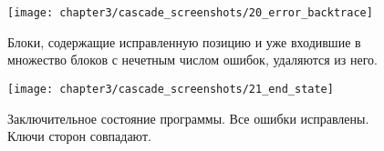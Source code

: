 \begin{figure}[h]
  \texttt{[image: chapter3/cascade\_screenshots/20\_error\_backtrace]}
  \caption{Блоки, содержащие исправленную позицию и уже входившие в множество блоков с нечетным числом ошибок, удаляются из него.}
\end{figure}

\begin{figure}[h]
  \texttt{[image: chapter3/cascade\_screenshots/21\_end\_state]}
  \caption{Заключительное состояние программы. Все ошибки исправлены. Ключи сторон совпадают.}
\end{figure}
\clearpage
